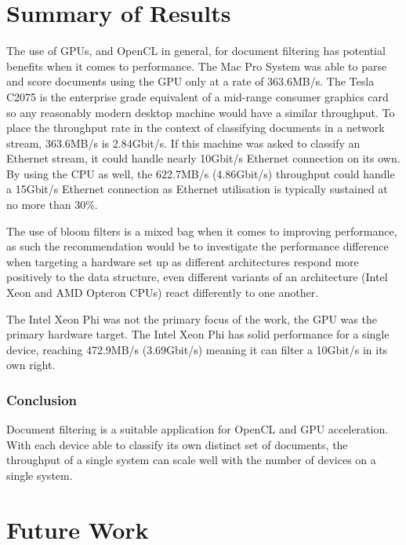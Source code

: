 \section{Summary of Results}

The use of GPUs, and OpenCL in general, for document filtering has potential
benefits when it comes to performance. The Mac Pro System was able to parse and
score documents using the GPU only at a rate of 363.6MB/s. The Tesla C2075 is
the enterprise grade equivalent of a mid-range consumer graphics card so any
reasonably modern desktop machine would have a similar throughput. To place the
throughput rate in the context of classifying documents in a network stream,
363.6MB/s is 2.84Gbit/s. If this machine was asked to classify an Ethernet
stream, it could handle nearly 10Gbit/s Ethernet connection on its own. By using
the CPU as well, the 622.7MB/s (4.86Gbit/s) throughput could handle a 15Gbit/s
Ethernet connection as Ethernet utilisation is typically sustained at no more
than 30\%.

The use of bloom filters is a mixed bag when it comes to improving performance,
as such the recommendation would be to investigate the performance difference
when targeting a hardware set up as different architectures respond more
positively to the data structure, even different variants of an architecture
(Intel Xeon and AMD Opteron CPUs) react differently to one another.

The Intel Xeon Phi was not the primary focus of the work, the GPU was the
primary hardware target. The Intel Xeon Phi has solid performance for a single
device, reaching 472.9MB/s (3.69Gbit/s) meaning it can filter a 10Gbit/s in its
own right.

\subsubsection{Conclusion}

Document filtering is a suitable application for OpenCL and GPU acceleration.
With each device able to classify its own distinct set of documents, the
throughput of a single system can scale well with the number of devices on a
single system.

\section{Future Work}

